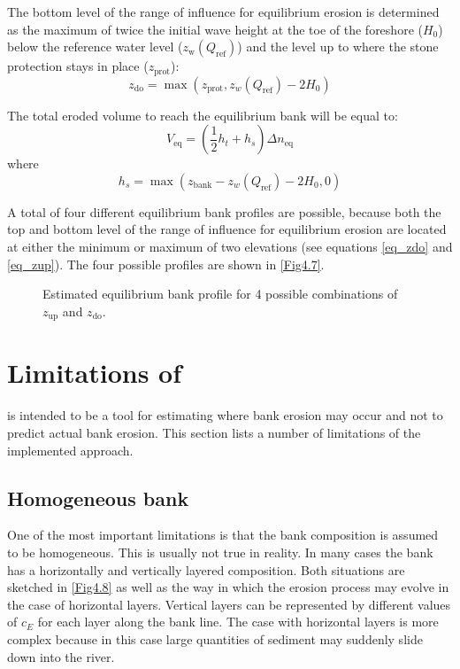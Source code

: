 The bottom level of the range of influence for equilibrium erosion is determined as the maximum of twice
the initial wave height at the toe of the foreshore ($H_0$) below the reference water level
($z_\text{w}(Q_\text{ref})$) and the level up to where the stone protection stays in place ($z_\text{prot}$):
\begin{equation}
z_\text{do} = \max (z_\text{prot}, z_w(Q_\text{ref}) - 2 H_0 )
\label{eq_zdo}
\end{equation}	

The total eroded volume to reach the equilibrium bank will be equal to:
\begin{equation}
V_\text{eq} = ( \frac{1}{2} h_t + h_s ) \Delta n_\text{eq}
\end{equation}
where 
\begin{equation}
h_s = \max ( z_\text{bank} - z_w(Q_\text{ref}) - 2 H_0, 0)
\end{equation}

A total of four different equilibrium bank profiles are possible, because both the top and bottom level of the range of influence for equilibrium erosion are located at either the minimum or maximum of two elevations (see equations \autoref{eq_zdo} and \autoref{eq_zup}). The four possible profiles are shown in \autoref{Fig4.7}. 
\begin{figure}[!h]
\center
\resizebox{14cm}{!}{
   
}
\caption{Estimated equilibrium bank profile for 4 possible combinations of $z_\text{up}$ and $z_\text{do}$.}
\label{Fig4.7}
\end{figure}

\section{Limitations of \dfastbe} \label{Sec4.7}

\dfastbe is intended to be a tool for estimating where bank erosion may occur and not to predict actual bank erosion.
This section lists a number of limitations of the implemented approach.

\subsection{Homogeneous bank}

One of the most important limitations is that the bank composition is assumed to be homogeneous.
This is usually not true in reality.
In many cases the bank has a horizontally and vertically layered composition.
Both situations are sketched in \autoref{Fig4.8} as well as the way in which the erosion process may evolve in the case of horizontal layers.
Vertical layers can be represented by different values of $c_E$ for each layer along the bank line.
The case with horizontal layers is more complex because in this case large quantities of sediment may suddenly slide down into the river.

